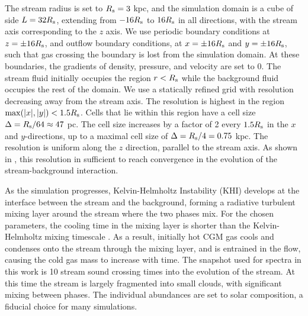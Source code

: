 \documentclass[fleqn,usenatbib]{mnras}
\begin{document}
The stream radius is set to $R_{\rm s}=3$ kpc, and the simulation domain is a cube of side $L=32R_{\rm s}$, extending from $-16R_{\rm s}$ to $16R_{\rm s}$ in all directions, with the stream axis corresponding to the $z$ axis.
We use periodic boundary conditions at $z=\pm 16R_{\rm s}$, and outflow boundary conditions, at $x=\pm 16R_{\rm s}$ and $y=\pm 16R_{\rm s}$, such that gas crossing the boundary is lost from the simulation domain.
At these boundaries, the gradients of density, pressure, and velocity are set to 0.
The stream fluid initially occupies the region $r<R_{\rm s}$ while the background fluid occupies the rest of the domain.
We use a statically refined grid with resolution decreasing away from the stream axis.
The resolution is highest in the region ${\rm max}(|x|,|y|)<1.5R_{\rm s}$.
Cells that lie within this region have a cell size $\Delta=R_{\rm s}/64\approx 47$ pc.
The cell size increases by a factor of 2 every $1.5R_{\rm s}$ in the $x$ and $y$-directions, up to a maximal cell size of $\Delta=R_{\rm s}/4=0.75$ kpc.
The resolution is uniform along the $z$ direction, parallel to the stream axis.
As shown in \cite{mandelker2020Instability}, this resolution in sufficient to reach convergence in the evolution of the stream-background interaction.

As the simulation progresses, Kelvin-Helmholtz Instability (KHI) develops at the interface between the stream and the background, forming a radiative turbulent mixing layer around the stream where the two phases mix.
For the chosen parameters, the cooling time in the mixing layer is shorter than the Kelvin-Helmholtz mixing timescale \citep{mandelker2020Instability}.
As a result, initially hot CGM gas cools and condenses onto the stream through the mixing layer, and is entrained in the flow, causing the cold gas mass to increase with time.
The snapshot used for spectra in this work is 10 stream sound crossing times into the evolution of the stream.
At this time the stream is largely fragmented into small clouds, with significant mixing between phases.
The individual abundances are set to solar composition,
a fiducial choice for many simulations.
\end{document}
